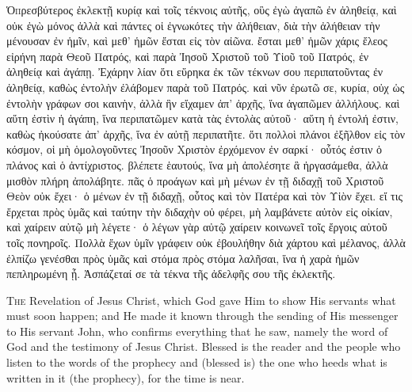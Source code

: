 \begin{pages}
    \begin{Rightside}
        \beginnumbering
		\renewcommand{\LettrineFontHook}{\PHtitl}
		\lettrine[lines=3]{Ὁ} πρεσβύτερος ἐκλεκτῇ κυρίᾳ καὶ τοῖς τέκνοις αὐτῆς, οὓς ἐγὼ ἀγαπῶ ἐν ἀληθείᾳ, καὶ οὐκ ἐγὼ μόνος ἀλλὰ καὶ πάντες οἱ ἐγνωκότες τὴν ἀλήθειαν, διὰ τὴν ἀλήθειαν τὴν μένουσαν ἐν ἡμῖν, καὶ μεθ’ ἡμῶν ἔσται εἰς τὸν αἰῶνα. ἔσται μεθ’ ἡμῶν χάρις ἔλεος εἰρήνη παρὰ Θεοῦ Πατρός, καὶ παρὰ Ἰησοῦ Χριστοῦ τοῦ Υἱοῦ τοῦ Πατρός, ἐν ἀληθείᾳ καὶ ἀγάπῃ.
		\pend
		\pstart
		Ἐχάρην λίαν ὅτι εὕρηκα ἐκ τῶν τέκνων σου περιπατοῦντας ἐν ἀληθείᾳ, καθὼς ἐντολὴν ἐλάβομεν παρὰ τοῦ Πατρός. καὶ νῦν ἐρωτῶ σε, κυρία, οὐχ ὡς ἐντολὴν γράφων σοι καινὴν, ἀλλὰ ἣν εἴχαμεν ἀπ’ ἀρχῆς, ἵνα ἀγαπῶμεν ἀλλήλους. καὶ αὕτη ἐστὶν ἡ ἀγάπη, ἵνα περιπατῶμεν κατὰ τὰς ἐντολὰς αὐτοῦ· αὕτη ἡ ἐντολή ἐστιν, καθὼς ἠκούσατε ἀπ’ ἀρχῆς, ἵνα ἐν αὐτῇ περιπατῆτε. ὅτι πολλοὶ πλάνοι ἐξῆλθον εἰς τὸν κόσμον, οἱ μὴ ὁμολογοῦντες Ἰησοῦν Χριστὸν ἐρχόμενον ἐν σαρκί· οὗτός ἐστιν ὁ πλάνος καὶ ὁ ἀντίχριστος. βλέπετε ἑαυτούς, ἵνα μὴ ἀπολέσητε ἃ ἠργασάμεθα, ἀλλὰ μισθὸν πλήρη ἀπολάβητε. πᾶς ὁ προάγων καὶ μὴ μένων ἐν τῇ διδαχῇ τοῦ Χριστοῦ Θεὸν οὐκ ἔχει· ὁ μένων ἐν τῇ διδαχῇ, οὗτος καὶ τὸν Πατέρα καὶ τὸν Υἱὸν ἔχει. εἴ τις ἔρχεται πρὸς ὑμᾶς καὶ ταύτην τὴν διδαχὴν οὐ φέρει, μὴ λαμβάνετε αὐτὸν εἰς οἰκίαν, καὶ χαίρειν αὐτῷ μὴ λέγετε· ὁ λέγων γὰρ αὐτῷ χαίρειν κοινωνεῖ τοῖς ἔργοις αὐτοῦ τοῖς πονηροῖς.
		\pend
		\pstart
	 	Πολλὰ ἔχων ὑμῖν γράφειν οὐκ ἐβουλήθην διὰ χάρτου καὶ μέλανος, ἀλλὰ ἐλπίζω γενέσθαι πρὸς ὑμᾶς καὶ στόμα πρὸς στόμα λαλῆσαι, ἵνα ἡ χαρὰ ἡμῶν πεπληρωμένη ᾖ. Ἀσπάζεταί σε τὰ τέκνα τῆς ἀδελφῆς σου τῆς ἐκλεκτῆς.
		\pend
        \endnumbering
    \end{Rightside}
    \begin{Leftside}
        \beginnumbering
        		\renewcommand\LettrineFontHook{\Zallmanfamily}
			\lettrine[lines=3]{T}{he} Revelation of Jesus Christ, which God gave Him to show His servants what must soon happen; and He made it known through the sending of His messenger to His servant John, who confirms everything that he saw, namely the word of God and the testimony of Jesus Christ. Blessed is the reader and the people who listen to the words of the prophecy and (blessed is) the one who heeds what is written in it (the prophecy), for the time is near.
		\pend
        \endnumbering
    \end{Leftside}

\end{pages} 
\Pages

